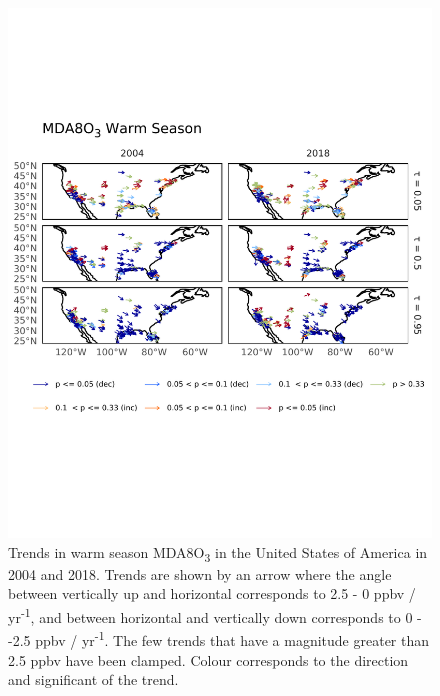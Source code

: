 \documentclass[journal abbreviation, manuscript]{copernicus}
\begin{document}
\begin{figure}[p]
\centering
\includegraphics[height=0.9\textheight]{figures/paper_figures/f10_o3_map_piecewise_stats_freeTau_mda8_anom_warm_us_o3.pdf}
\caption{Trends in warm season MDA8O\textsubscript{3} in the United States of America in 2004 and 2018. Trends are shown by an arrow where the angle between vertically up and horizontal corresponds to 2.5 - 0 ppbv / yr\textsuperscript{-1}, and between horizontal and vertically down corresponds to 0 - -2.5 ppbv / yr\textsuperscript{-1}. The few trends that have a magnitude greater than 2.5 ppbv have been clamped. Colour corresponds to the direction and significant of the trend.}
\label{fig:o3_map_us_mda8_warm}
\end{figure}
\clearpage


\end{document}
